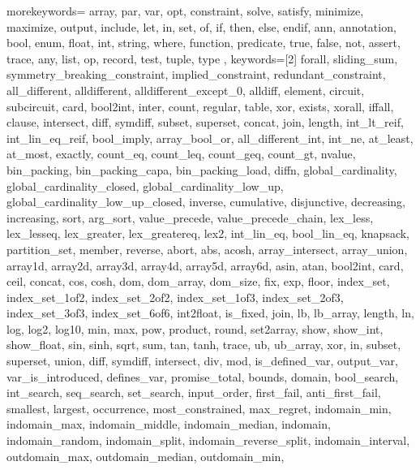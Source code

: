 \usepackage{listings}
\usepackage{courier} %

\newcommand\mznfont{\fontfamily{pcr}\selectfont}

{
  morekeywords={
  array, par, var, opt, constraint, solve, satisfy, minimize,
  maximize, output, include, let, in, set, of, if, then, else, endif,
  ann, annotation, bool, enum, float, int, string, where, function,
  predicate, true, false, not, assert, trace,
  any, list, op, record, test, tuple, type
  },
  keywords=[2]{
  forall, sliding_sum, symmetry_breaking_constraint,
  implied_constraint, redundant_constraint, all_different,
  alldifferent, alldifferent_except_0, alldiff, element, circuit,
  subcircuit, card, bool2int, inter, count, regular, table, xor,
  exists, xorall, iffall, clause, intersect, diff, symdiff, subset,
  superset, concat, join, length, int_lt_reif, int_lin_eq_reif,
  bool_imply, array_bool_or, all_different_int, int_ne, at_least,
  at_most, exactly, count_eq, count_leq, count_geq, count_gt, nvalue,
  bin_packing, bin_packing_capa, bin_packing_load, diffn,
  global_cardinality, global_cardinality_closed,
  global_cardinality_low_up, global_cardinality_low_up_closed,
  inverse, cumulative, disjunctive, decreasing, increasing, sort,
  arg_sort, value_precede, value_precede_chain, lex_less, lex_lesseq,
  lex_greater, lex_greatereq, lex2, int_lin_eq, bool_lin_eq, knapsack,
  partition_set, member, reverse,
  abort, abs, acosh, array_intersect, array_union, array1d, array2d,
  array3d, array4d, array5d, array6d, asin, atan, bool2int, card,
  ceil, concat, cos, cosh, dom, dom_array, dom_size, fix, exp, floor,
  index_set, index_set_1of2, index_set_2of2, index_set_1of3,
  index_set_2of3, index_set_3of3, index_set_6of6, int2float, is_fixed,
  join, lb, lb_array, length, ln, log, log2, log10, min, max, pow,
  product, round, set2array, show, show_int, show_float, sin, sinh,
  sqrt, sum, tan, tanh, trace, ub, ub_array, xor, in, subset,
  superset, union, diff, symdiff, intersect, div, mod,
  is_defined_var, output_var, var_is_introduced, defines_var,
  promise_total, bounds, domain, bool_search, int_search, seq_search,
  set_search, input_order, first_fail, anti_first_fail, smallest,
  largest, occurrence, most_constrained, max_regret, indomain_min,
  indomain_max, indomain_middle, indomain_median, indomain,
  indomain_random, indomain_split, indomain_reverse_split,
  indomain_interval, outdomain_max, outdomain_median, outdomain_min,
}}

